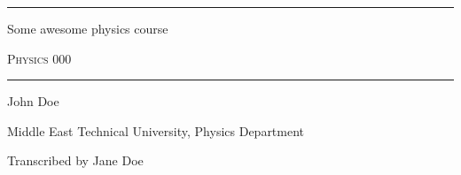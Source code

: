 \documentclass[../main.tex]{subfiles}
\newcommand{\courseCode}{Physics 000}
\newcommand{\university}{Middle East Technical University}
\newcommand{\department}{Physics Department}
\newcommand{\courseName}{Some awesome physics course}
\newcommand{\instructorName}{John Doe}
\newcommand{\editorName}{Jane Doe}
\begin{document}
    \begin{titlepage}
        \centering
        \vspace*{1.5cm}
        {\noindent\rule{\textwidth}{0.4mm}\par}
        {\Huge\textsc\courseName \par}
        \vspace{1em}
        {\scshape{\Large\courseCode} \par}
        {\noindent\rule{\textwidth}{0.4mm}\par}
        \vspace{1cm}
        {\Large \instructorName \par}
        \vfill
        {\large \university, \department \par}
        {\large Transcribed by \editorName \par}
    \end{titlepage}
\end{document}
